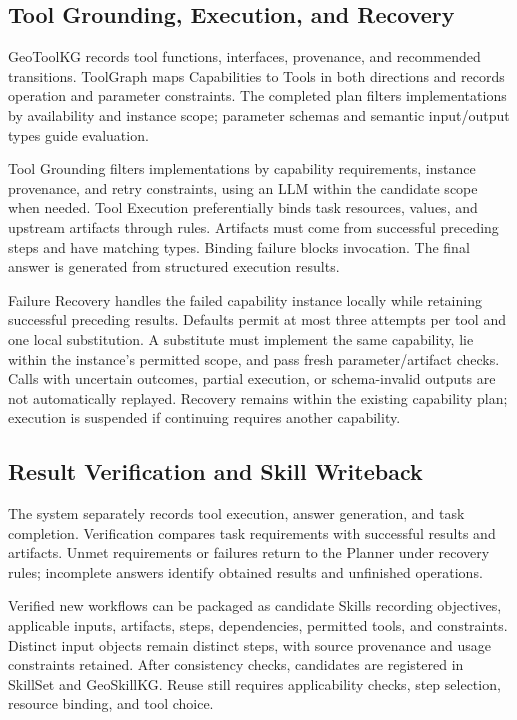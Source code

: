\subsection{Tool Grounding, Execution, and Recovery}
GeoToolKG records tool functions, interfaces, provenance, and recommended transitions. ToolGraph maps Capabilities to Tools in both directions and records operation and parameter constraints. The completed plan filters implementations by availability and instance scope; parameter schemas and semantic input/output types guide evaluation.

Tool Grounding filters implementations by capability requirements, instance provenance, and retry constraints, using an LLM within the candidate scope when needed. Tool Execution preferentially binds task resources, values, and upstream artifacts through rules. Artifacts must come from successful preceding steps and have matching types. Binding failure blocks invocation. The final answer is generated from structured execution results.

Failure Recovery handles the failed capability instance locally while retaining successful preceding results. Defaults permit at most three attempts per tool and one local substitution. A substitute must implement the same capability, lie within the instance's permitted scope, and pass fresh parameter/artifact checks. Calls with uncertain outcomes, partial execution, or schema-invalid outputs are not automatically replayed. Recovery remains within the existing capability plan; execution is suspended if continuing requires another capability.

\subsection{Result Verification and Skill Writeback}
The system separately records tool execution, answer generation, and task completion. Verification compares task requirements with successful results and artifacts. Unmet requirements or failures return to the Planner under recovery rules; incomplete answers identify obtained results and unfinished operations.

Verified new workflows can be packaged as candidate Skills recording objectives, applicable inputs, artifacts, steps, dependencies, permitted tools, and constraints. Distinct input objects remain distinct steps, with source provenance and usage constraints retained. After consistency checks, candidates are registered in SkillSet and GeoSkillKG. Reuse still requires applicability checks, step selection, resource binding, and tool choice.

